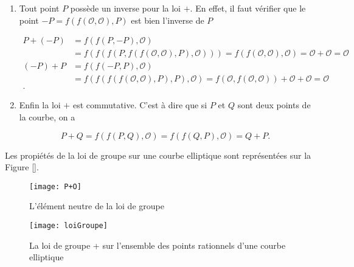 \begin{demonstration}
\begin{enumerate}
        \item Tout point $P$ possède un inverse pour la loi $+$. En effet, il faut vérifier que
            le point $-P= f(f(\mathcal{O},\mathcal{O}),P)$ est bien l'inverse de $P$ 

            \begin{align*}
                P + (-P) &= f(f(P,-P),\mathcal{O}) \\
                &= f(f(f(P,f(f(\mathcal{O},\mathcal{O}),P),\mathcal{O}))) =
                f(f(\mathcal{O},\mathcal{O}),\mathcal{O}) =
                \mathcal{O}+\mathcal{O}=\mathcal{O}  \\
                (-P) + P &= f(f(-P,P),\mathcal{O}) \\
                &= f(f(f(f(\mathcal{O},\mathcal{O}),P),P),\mathcal{O}) =
                f(\mathcal{O},f(\mathcal{O},\mathcal{O})) + \mathcal{O}+\mathcal{O}=
                \mathcal{O} \\
            .\end{align*}

        \item Enfin la loi $+$ est commutative. C'est à dire que si $P$ et $Q$ sont deux
            points de la courbe, on a

            \[
            P + Q = f(f(P,Q),\mathcal{O}) = f(f(Q,P),\mathcal{O}) = Q + P
            .\] 
    \end{enumerate}    
\end{demonstration}

Les propiétés de la loi de groupe sur une courbe elliptique sont représentées sur la Figure
\ref{}.

\begin{figure}[h]
    \centering
    \texttt{[image: P+O]}
    \caption{L'élément neutre de la loi de groupe}
    \label{fig:P-O}
\end{figure}

\begin{figure}[h]
    \centering
    \texttt{[image: loiGroupe]}
    \caption{La loi de groupe + sur l'ensemble des points rationnels d'une courbe
    elliptique}
    \label{fig:loiGroupe}
\end{figure}


